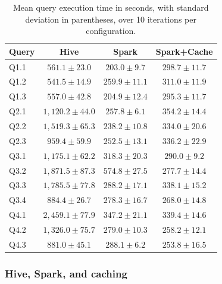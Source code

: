 \begin{table}[htbp]
  \centering
  \caption{Mean query execution time in seconds, with standard deviation in
           parentheses, over 10 iterations per configuration.}
  \label{tab:benchmark-results}
  \renewcommand{\arraystretch}{1.15}
  \small
  \begin{tabular}{@{} l c c c @{}}
    \hline
    \textbf{Query} & \textbf{Hive} & \textbf{Spark} & \textbf{Spark+Cache} \\
    \hline
    Q1.1  & $561.1 \pm 23.0$ & $203.0 \pm 9.7$ & $298.7 \pm 11.7$ \\
    Q1.2  & $541.5 \pm 14.9$ & $259.9 \pm 11.1$ & $311.0 \pm 11.9$ \\
    Q1.3  & $557.0 \pm 42.8$ & $204.9 \pm 12.4$ & $295.3 \pm 11.7$ \\
    Q2.1  & $1{,}120.2 \pm 44.0$ & $257.8 \pm 6.1$ & $354.2 \pm 14.4$ \\
    Q2.2  & $1{,}519.3 \pm 65.3$ & $238.2 \pm 10.8$ & $334.0 \pm 20.6$ \\
    Q2.3  & $959.4 \pm 59.9$ & $252.5 \pm 13.1$ & $336.2 \pm 22.9$ \\
    Q3.1  & $1{,}175.1 \pm 62.2$ & $318.3 \pm 20.3$ & $290.0 \pm 9.2$ \\
    Q3.2  & $1{,}871.5 \pm 87.3$ & $574.8 \pm 27.5$ & $277.7 \pm 14.4$ \\
    Q3.3  & $1{,}785.5 \pm 77.8$ & $288.2 \pm 17.1$ & $338.1 \pm 15.2$ \\
    Q3.4  & $884.4 \pm 26.7$ & $278.3 \pm 16.7$ & $268.0 \pm 14.8$ \\
    Q4.1  & $2{,}459.1 \pm 77.9$ & $347.2 \pm 21.1$ & $339.4 \pm 14.6$ \\
    Q4.2  & $1{,}326.0 \pm 75.7$ & $279.0 \pm 10.3$ & $258.2 \pm 12.1$ \\
    Q4.3  & $881.0 \pm 45.1$ & $288.1 \pm 6.2$ & $253.8 \pm 16.5$ \\
    \hline
  \end{tabular}
\end{table}

\subsubsection{Hive, Spark, and caching}


